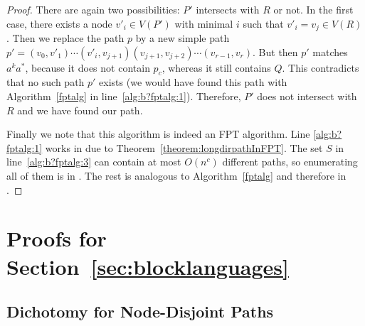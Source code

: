 \documentclass[a4paper,english]{lipics-v2016}
\theoremstyle{plain}
\begin{document}
\begin{proof}
  There are again two possibilities: $P'$ intersects with $R$ or
  not. In the first case, there exists a node $v'_i \in V(P')$ with
  minimal $i$ such that $v'_i = v_j \in V(R)$.  Then we replace the path $p$ by a new simple path $p' = (v_0,v'_1) \cdots
  (v'_{i},v_{j+1})(v_{j+1},v_{j+2}) \cdots (v_{r-1},v_r)$. But then
  $p'$ matches $a^ka^*$, because it does not contain $p_c$, whereas it
  still contains $Q$. This contradicts that no such path $p'$ exists
  (we would have found this path with Algorithm~\ref{fptalg} in
  line~\ref{alg:b?fptalg:1}).  Therefore, $P'$ does not intersect with
  $R$ and we have found our path.

  Finally we note that this algorithm is indeed an FPT algorithm. Line
  \ref{alg:b?fptalg:1} works in \fpt due to
  Theorem~\ref{theorem:longdirpathInFPT}. The set $S$ in
  line~\ref{alg:b?fptalg:3} can contain at most $O(n^c)$ different
  paths, so enumerating all of them is in \ptime. The rest is
  analogous to Algorithm~\ref{fptalg} and therefore in \fpt.
\end{proof}



\section{Proofs for Section~\ref{sec:blocklanguages}}


\subsection{Dichotomy for Node-Disjoint Paths}
\end{document}
